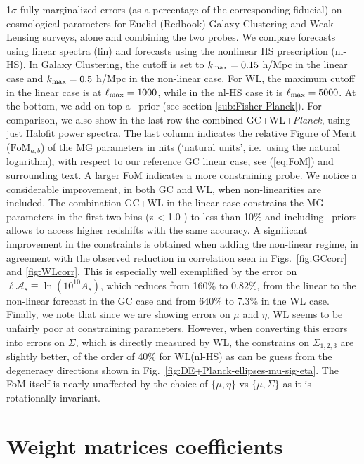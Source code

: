 \begin{table}[htbp]
{1$\sigma$
fully marginalized errors (as a percentage of the corresponding fiducial) on cosmological parameters for Euclid (Redbook) Galaxy Clustering and Weak Lensing surveys, alone and combining the two probes. We compare forecasts using linear spectra (lin) and forecasts using the nonlinear HS prescription (nl-HS). In Galaxy Clustering, the cutoff is set to $k_{\rm max}=0.15$ h/Mpc in the linear case and $k_{\rm max}=0.5$ h/Mpc in the non-linear case.
For WL, the maximum cutoff in the linear case is at $\ell_{\rm max} = 1000$, 
while in the nl-HS case it is $\ell_{\rm max} = 5000$.
At the bottom, we add on top a \planck\ prior (see section \ref{sub:Fisher-Planck}).
For comparison, we also show in the last row the combined GC+WL+{\it Planck}, using just Halofit power spectra. 
The last column indicates the relative Figure of Merit ($\text{FoM}_{a,b}$) of the MG parameters in nits (`natural units', i.e.\ using the natural logarithm), with respect to our reference GC linear case, see (\ref{eq:FoM}) and surrounding text. A larger FoM indicates a more constraining probe. We notice a considerable improvement, in both GC and WL, when non-linearities are included.
The combination GC+WL in the linear case 
constrains the MG parameters in the first two bins (z < 1.0 ) to less than 10$\%$ and including \planck\ priors allows to access higher redshifts with the same accuracy. A significant improvement in the constraints is obtained when adding the non-linear regime, in agreement with the observed reduction in correlation seen in Figs.\ \ref{fig:GCcorr} and \ref{fig:WLcorr}. This is especially well exemplified by the error on $\ell \mathcal{A}_s \equiv \ln(10^{10} A_{s})$, which reduces from 160\%  to 0.82\%, from the linear to the non-linear forecast in the GC case
and from 640\%  to 7.3\% in the WL case. 
Finally, we note that since we are showing errors on $\mu$ and $\eta$, WL seems to be unfairly poor at constraining parameters. However, when converting this errors into errors on $\Sigma$, which is directly measured by WL, the constrains on $\Sigma_{1,2,3}$ are slightly better, of the order of 40\% for WL(nl-HS) as can be guess from the degeneracy directions shown in Fig.\ \ref{fig:DE+Planck-ellipses-mu-sig-eta}. The FoM itself is nearly unaffected by the choice of $\{\mu,\eta\}$ vs $\{\mu,\Sigma\}$ as it is rotationally invariant.
}
\end{table}
\normalsize

\section{Weight matrices coefficients}
\label{sec:Wmatrices}

